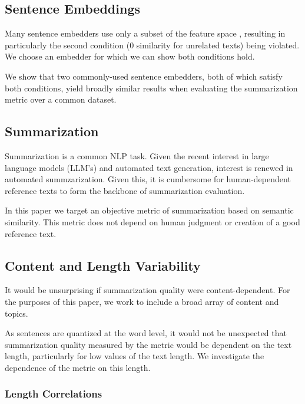 \documentclass{article}
\newcommand\mycolor{\color{red}\xspace}
\begin{document}
\subsection{Sentence Embeddings}


Many sentence embedders use only a subset of the feature space \citep{badembeddings}, resulting in particularly the second condition (0 similarity for unrelated texts) being violated.
We choose an embedder for which we can show both conditions hold.

We show that two commonly-used sentence embedders, both of which satisfy both conditions, yield broadly similar results when evaluating the summarization metric over a common dataset.


\subsection{Summarization}

Summarization is a common NLP task. 
Given the recent interest in large language models (LLM's) and automated text generation, interest is renewed in automated summzarization.
Given this, it is cumbersome for human-dependent reference texts to form the backbone of summarization evaluation.

In this paper we target an objective metric of summarization based on semantic similarity.
This metric does not depend on human judgment or creation of a good reference text.

\subsection{Content and Length Variability}

It would be unsurprising if summarization quality were content-dependent.  
For the purposes of this paper, we work to include a broad array of content and topics.

As sentences are quantized at the word level, it would not be unexpected that summarization quality measured by the metric would be dependent on the text length, particularly for low values of the text length.  We investigate the dependence of the metric on this length.

\subsubsection{Length Correlations}
\end{document}
